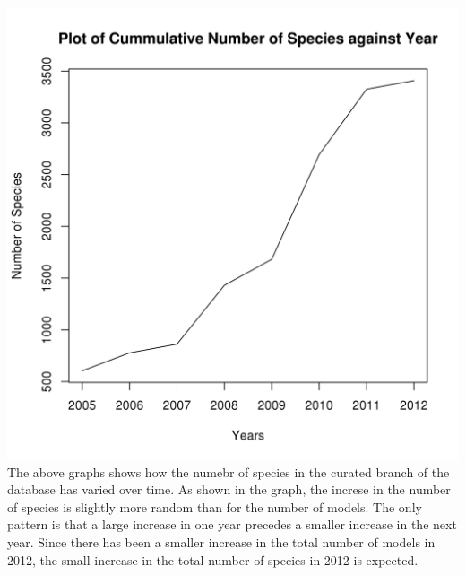 \documentclass[portrait,a0paper,fontscale=0.35]{baposter}
\begin{document}
\begin{poster}
{\begin{multicols}{2}
 \includegraphics[trim= 1.5mm 5mm 5mm 4.5mm, clip, scale=0.4]{Poster-images/CummulativeSpeciesPlot.png}
 The above graphs shows how the numebr of species in the curated branch of the database has varied over time. As shown in the graph, the increse in the number of species is slightly more random than for the number of models. The only pattern is that a large increase in one year precedes a smaller increase in the next year.
 Since there has been a smaller increase in the total number of models in 2012, the small increase in the total number of species in 2012 is expected.
 \end{multicols}
 }
 
\end{poster}
\end{document}
